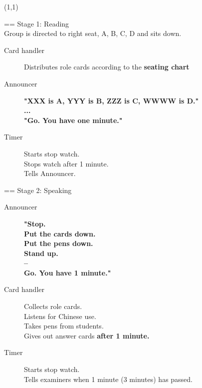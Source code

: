 \documentclass[a4paper]{article}
\begin{document}
\begin{textblock}{14}(1,1)

\Huge == Stage 1: Reading\\

\large \mdseries
Group is directed to right seat, A, B, C, D and sits down.\\

\begin{description}

\item [Card handler] Distributes role cards according to the \textbf{seating chart}\\
\item [Announcer]
\Large \bfseries
	"XXX is A, YYY is B, ZZZ is C, WWWW is D."\\
	...\\
	"Go. You have one minute."\\
\large \mdseries
\item [Timer]	Starts stop watch.\\
	Stops watch after 1 minute.\\
	Tells Announcer.\\

\end{description}

\Huge == Stage 2: Speaking\\

\large \mdseries

\begin{description}

\item [Announcer]
\Large \bfseries
	"Stop.\\
	Put the cards down.\\
	Put the pens down.\\
	Stand up.\\
	--\\
	Go. You have 1 minute."\\

\large \mdseries
\item [Card handler]
	Collects role cards.\\
	Listens for Chinese use.\\
	Takes pens from students.\\
	Gives out answer cards \textbf{after 1 minute.}\\
\item [Timer]
	Starts stop watch.\\
	Tells examiners when 1 minute (3 minutes) has passed.\\


\end{description}
\end{textblock}
\end{document}
